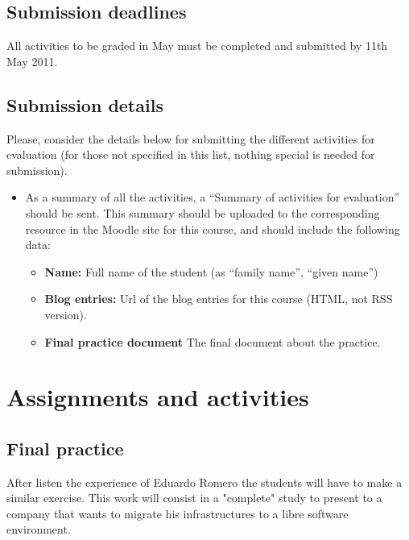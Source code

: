 \documentclass[a4paper]{article}
\begin{document}
\subsection{Submission deadlines}

All activities to be graded in May must be completed and submitted by 11th May 2011.

\subsection{Submission details}

Please, consider the details below for submitting the different activities for evaluation (for those not specified in this list, nothing special is needed for submission).

\begin{itemize}
\item As a summary of all the activities, a ``Summary of activities for evaluation'' should be sent. This summary should be uploaded to the corresponding resource in the Moodle site for this course, and should include the following data:
  \begin{itemize}
  \item \textbf{Name:} Full name of the student (as ``family name'', ``given name'')
  \item \textbf{Blog entries:} Url of the blog entries for this course (HTML, not RSS version).
  \item \textbf{Final practice document} The final document about the practice.  
  \end{itemize}
\end{itemize}

\section{Assignments and activities}

\subsection{Final practice}

After listen the experience of Eduardo Romero the students will have to make a similar exercise. This work will consist in a "complete" study to present to a company that wants to migrate his infrastructures to a libre software environment. 
\end{document}
